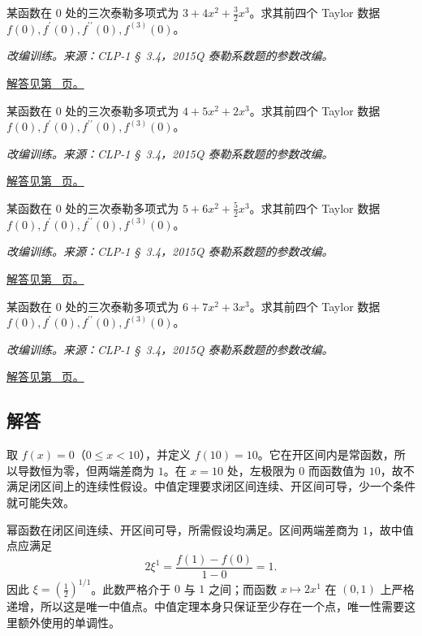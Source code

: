 \documentclass[UTF8,12pt,a4paper,fontset=fandol]{ctexart}
\begin{document}
\begin{example}[由泰勒系数恢复导数]\label{ex:c10q22}
某函数在 $0$ 处的三次泰勒多项式为 $3+4x^2+\frac{3}{2}x^3$。求其前四个 Taylor 数据 $f(0),f^{\prime}(0),f^{\prime\prime}(0),f^{(3)}(0)$。
\par\textit{改编训练。来源：CLP-1 \S~3.4，2015Q 泰勒系数题的参数改编。}\par\hyperref[ans:c10q22]{解答见第~\pageref{ans:c10q22} 页。}
\end{example}
\begin{example}[由泰勒系数恢复导数]\label{ex:c10q23}
某函数在 $0$ 处的三次泰勒多项式为 $4+5x^2+2x^3$。求其前四个 Taylor 数据 $f(0),f^{\prime}(0),f^{\prime\prime}(0),f^{(3)}(0)$。
\par\textit{改编训练。来源：CLP-1 \S~3.4，2015Q 泰勒系数题的参数改编。}\par\hyperref[ans:c10q23]{解答见第~\pageref{ans:c10q23} 页。}
\end{example}
\begin{example}[由泰勒系数恢复导数]\label{ex:c10q24}
某函数在 $0$ 处的三次泰勒多项式为 $5+6x^2+\frac{5}{2}x^3$。求其前四个 Taylor 数据 $f(0),f^{\prime}(0),f^{\prime\prime}(0),f^{(3)}(0)$。
\par\textit{改编训练。来源：CLP-1 \S~3.4，2015Q 泰勒系数题的参数改编。}\par\hyperref[ans:c10q24]{解答见第~\pageref{ans:c10q24} 页。}
\end{example}
\begin{example}[由泰勒系数恢复导数]\label{ex:c10q25}
某函数在 $0$ 处的三次泰勒多项式为 $6+7x^2+3x^3$。求其前四个 Taylor 数据 $f(0),f^{\prime}(0),f^{\prime\prime}(0),f^{(3)}(0)$。
\par\textit{改编训练。来源：CLP-1 \S~3.4，2015Q 泰勒系数题的参数改编。}\par\hyperref[ans:c10q25]{解答见第~\pageref{ans:c10q25} 页。}
\end{example}
\subsection{解答}
\begin{solve}\label{ans:c10q1}
取 $f(x)=0$（$0\le x<10$），并定义 $f(10)=10$。它在开区间内是常函数，所以导数恒为零，但两端差商为 $1$。在 $x=10$ 处，左极限为 $0$ 而函数值为 $10$，故不满足闭区间上的连续性假设。中值定理要求闭区间连续、开区间可导，少一个条件就可能失效。
\end{solve}

\begin{solve}\label{ans:c10q2}
幂函数在闭区间连续、开区间可导，所需假设均满足。区间两端差商为 $1$，故中值点应满足
\[
2\xi^{1}=\frac{f(1)-f(0)}{1-0}=1.
\]
因此 $\xi=(\frac{1}{2})^{1/1}$。此数严格介于 $0$ 与 $1$ 之间；而函数 $x\mapsto 2x^{1}$ 在 $(0,1)$ 上严格递增，所以这是唯一中值点。中值定理本身只保证至少存在一个点，唯一性需要这里额外使用的单调性。
\end{solve}
\end{document}
